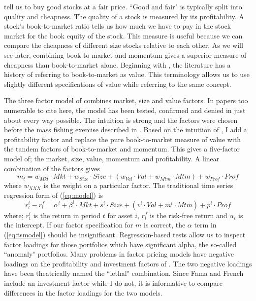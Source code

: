 \textcite{graham1934security} tell us to buy good stocks at a fair price.
``Good and fair" is typically split into quality and cheapness.
The quality of a stock is measured by its profitability.
A stock's book-to-market ratio tells us how much we have to pay in the stock 
market for the book equity of the stock.
This measure is useful because we can compare the cheapness of 
different size stocks relative to each other.
As we will see later, combining book-to-market and momentum gives a superior 
measure of cheapness than book-to-market alone.
Beginning with \textcite{fama1992cross}, the literature has a history of 
referring to book-to-market as value.
This terminology allows us to use slightly different specifications of 
value while referring to the same concept.

The three factor model of \textcite{fama1993common} combines market, size and
value factors.
In papers too numerable to cite here, the model has been tested, confirmed and
denied in just about every way possible.
The intuition is strong and the factors were chosen before the mass fishing 
exercise described in \textcite{harvey2016and}.
Based on the intuition of \textcite{graham1934security}, I add a profitability 
factor and replace the pure book-to-market measure of
value with the tandem factors of book-to-market and momentum.
This gives a five-factor model of; the market, size, value, momentum and
profitability. A linear combination of the factors gives
\begin{equation}
\label{eq:model}
m_t= w_{Mkt} \cdot Mkt + w_{Size} \cdot Size +
\left( w_{Val} \cdot Val + w_{Mtm} \cdot Mtm \right) + 
w_{Prof} \cdot Prof
\end{equation}
where $w_{XXX}$ is the weight on a particular factor.
The traditional time series regression form of (\ref{eq:model}) is
\begin{equation}
\label{eq:tsmodel}
r_t^i - r_t^f= \alpha^i + \beta^i \cdot Mkt + s^i \cdot Size +
\left( v^i \cdot Val + m^i \cdot Mtm \right) +
p^i \cdot Prof
\end{equation}
where; $r_t^i$ is the return in period $t$ for asset $i$, $r_t^f$ is the 
risk-free return and $\alpha_i$ is the intercept.
If our factor specification for $m$ is correct, the $\alpha$ term in 
(\ref{eq:tsmodel}) should be insignificant.
Regression-based tests allow us to inspect factor loadings for those 
portfolios which have significant alpha, the so-called ``anomaly" portfolios.
Many problems in factor pricing models have negative loadings on the 
profitability and investment factors of \textcite{fama2016dissecting}.
The two negative loadings have been theatrically named the ``lethal" 
combination.
Since Fama and French include an investment factor while I do 
not, it is informative to compare differences in the factor loadings for the 
two models.

